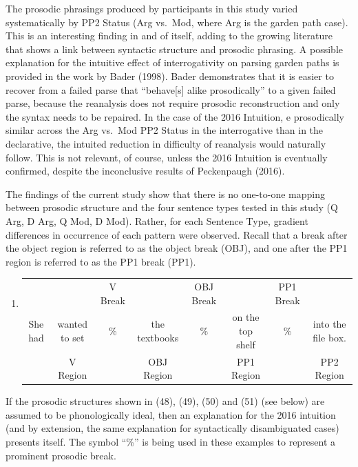 \documentclass[11pt,oneside]{book}
\providecommand{\tightlist}{%
  \setlength{\itemsep}{0pt}\setlength{\parskip}{0pt}}
\begin{document}
The prosodic phrasings produced by participants in this study varied systematically by PP2 Status (Arg vs.~Mod, where Arg is the garden path case). This is an interesting finding in and of itself, adding to the growing literature that shows a link between syntactic structure and prosodic phrasing. A possible explanation for the intuitive effect of interrogativity on parsing garden paths is provided in the work by Bader (1998). Bader demonstrates that it is easier to recover from a failed parse that ``behave{[}s{]} alike prosodically'' to a given failed parse, because the reanalysis does not require prosodic reconstruction and only the syntax needs to be repaired. In the case of the 2016 Intuition, e prosodically similar across the Arg vs.~Mod PP2 Status in the interrogative than in the declarative, the intuited reduction in difficulty of reanalysis would naturally follow. This is not relevant, of course, unless the 2016 Intuition is eventually confirmed, despite the inconclusive results of Peckenpaugh (2016).

The findings of the current study show that there is no one-to-one mapping between prosodic structure and the four sentence types tested in this study (Q Arg, D Arg, Q Mod, D Mod). Rather, for each Sentence Type, gradient differences in occurrence of each pattern were observed. Recall that a break after the object region is referred to as the object break (OBJ), and one after the PP1 region is referred to as the PP1 break (PP1).

\begin{enumerate}
\def\labelenumi{(\arabic{enumi})}
\setcounter{enumi}{46}
\tightlist
\item
  \begingroup
  \setlength{\tabcolsep}{1pt}

  \begin{tabular}{cccccccc}
    & & \footnotesize V Break & & \footnotesize OBJ Break & & \footnotesize PP1 Break & \\
    She had & wanted to set & \% & the textbooks & \% & on the top shelf & \% & into the file box. \\
    \cmidrule(r){2-2} \cmidrule(r){4-4} \cmidrule(r){6-6} \cmidrule(r){8-8} 
    & \footnotesize V Region & & \footnotesize OBJ Region & & \footnotesize PP1 Region & & PP2 Region \\
  \end{tabular}
    \endgroup
\end{enumerate}

If the prosodic structures shown in (48), (49), (50) and (51) (see below) are assumed to be phonologically ideal, then an explanation for the 2016 intuition (and by extension, the same explanation for syntactically disambiguated cases) presents itself. The symbol ``\%'' is being used in these examples to represent a prominent prosodic break.
\end{document}
